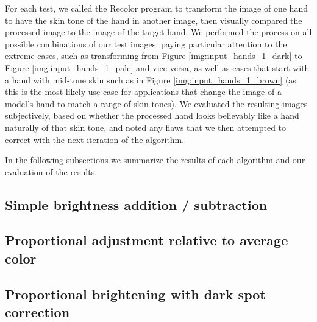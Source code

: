  For each test, we called the Recolor program to transform the image of one hand to have the skin tone of the hand in another image, then visually compared the processed image to the image of the target hand. We performed the process on all possible combinations of our test images, paying particular attention to the extreme cases, such as transforming from Figure \ref{img:input_hands_1_dark} to Figure \ref{img:input_hands_1_pale} and vice versa, as well as cases that start with a hand with mid-tone skin such as in Figure \ref{img:input_hands_1_brown} (as this is the most likely use case for applications that change the image of a model's hand to match a range of skin tones). We evaluated the resulting images subjectively, based on whether the processed hand looks believably like a hand naturally of that skin tone, and noted any flaws that we then attempted to correct with the next iteration of the algorithm.

In the following subsections we summarize the results of each algorithm and our evaluation of the results.

\subsection{Simple brightness addition / subtraction}


\subsection{Proportional adjustment relative to average color}


\subsection{Proportional brightening with dark spot correction}
